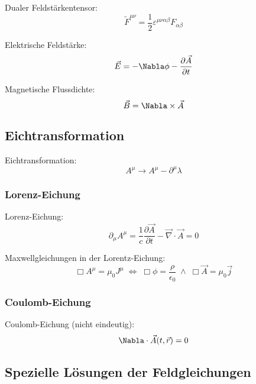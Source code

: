 \documentclass[11pt]{article}
\numberwithin{equation}{section}
\begin{document}
      Dualer Feldstärkentensor:
      \begin{equation}
        \tilde{F}^{\mu\nu} = \frac{1}{2}\varepsilon^{\mu\nu\alpha\beta}F_{\alpha\beta}
      \end{equation}

      Elektrische Feldstärke:
      \begin{equation}
        \vec{E} = -\Nabla\phi-\pder{\vec{A}}{t}
      \end{equation}

      Magnetische Flussdichte:
      \begin{equation}
        \vec{B} = \Nabla\times\vec{A}
      \end{equation}

    \subsection{Eichtransformation}
      Eichtransformation:
      \begin{equation}
        A^\mu \rightarrow A^\mu-\partial^\mu \lambda
      \end{equation}

      \subsubsection{Lorenz-Eichung}
        Lorenz-Eichung:
        \begin{equation}
          \partial_\mu A^\mu = \frac{1}{c}\frac{\partial \vec{A}}{\partial t} - \vec{\nabla}\cdot\vec{A} = 0
        \end{equation}

        Maxwellgleichungen in der Lorentz-Eichung:
        \begin{equation}
          \Box A^\mu = \mu_0 J^\mu \;\Leftrightarrow\;
          \Box \phi = \dfrac{\rho}{\epsilon_0} \;\wedge\;
          \Box \vec{A} = \mu_0 \vec{j}
        \end{equation}

      \subsubsection{Coulomb-Eichung}
        Coulomb-Eichung (nicht eindeutig):
        \begin{equation}
          \Nabla\cdot\vec{A}(t,\vec{r})=0
        \end{equation}

    \subsection{Spezielle Lösungen der Feldgleichungen}
\end{document}
